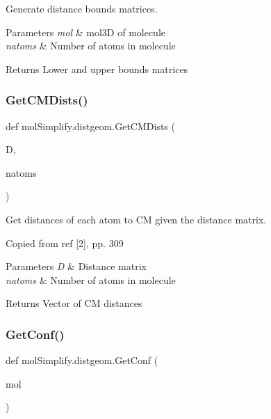 Generate distance bounds matrices. 


\begin{DoxyParams}{Parameters}
{\em mol} & mol3D of molecule \\
\hline
{\em natoms} & Number of atoms in molecule \\
\hline
\end{DoxyParams}
\begin{DoxyReturn}{Returns}
Lower and upper bounds matrices 
\end{DoxyReturn}
\mbox{\label{namespacemolSimplify_1_1distgeom_a0e20f4ca4b2932cc006bc638df4fe07b}} 
\subsubsection{\texorpdfstring{Get\+C\+M\+Dists()}{GetCMDists()}}
{\footnotesize\ttfamily def mol\+Simplify.\+distgeom.\+Get\+C\+M\+Dists (\begin{DoxyParamCaption}\item[{}]{D,  }\item[{}]{natoms }\end{DoxyParamCaption})}



Get distances of each atom to CM given the distance matrix. 

Copied from ref \mbox{[}2\mbox{]}, pp. 309 
\begin{DoxyParams}{Parameters}
{\em D} & Distance matrix \\
\hline
{\em natoms} & Number of atoms in molecule \\
\hline
\end{DoxyParams}
\begin{DoxyReturn}{Returns}
Vector of CM distances 
\end{DoxyReturn}
\mbox{\label{namespacemolSimplify_1_1distgeom_ae5eb55abad68fccba5f8fa87b706d7a3}} 
\subsubsection{\texorpdfstring{Get\+Conf()}{GetConf()}}
{\footnotesize\ttfamily def mol\+Simplify.\+distgeom.\+Get\+Conf (\begin{DoxyParamCaption}\item[{}]{mol }\end{DoxyParamCaption})}



